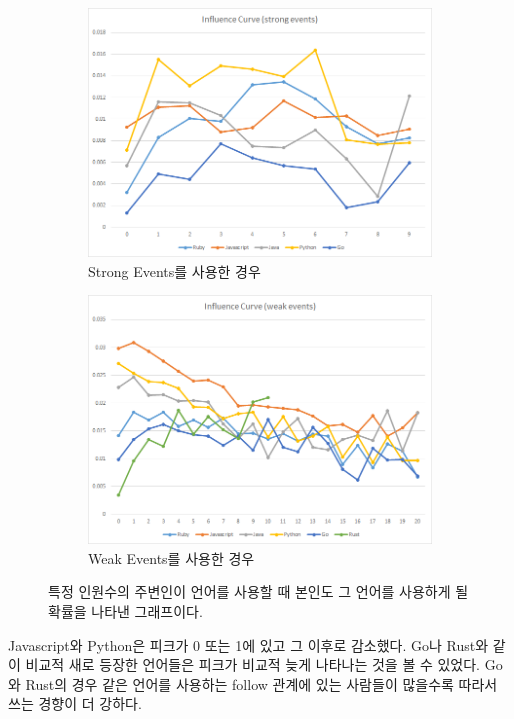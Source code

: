 \documentclass[10pt, a4paper, titlepage]{article}
\begin{document}
\begin{figure}
	\begin{subfigure}{0.99\textwidth}
		\includegraphics[width=\textwidth]{image01}
		\caption{Strong Events를 사용한 경우}
	\end{subfigure}

	\begin{subfigure}{0.99\textwidth}
		\includegraphics[width=\textwidth]{image18}
		\caption{Weak Events를 사용한 경우}
	\end{subfigure}

	\caption{특정 인원수의 주변인이 언어를 사용할 때 본인도 그 언어를 사용하게 될 확률을 나타낸 그래프이다.}
\label{fig:infcurve}
\end{figure}


Javascript와 Python은 피크가 0 또는 1에 있고 그 이후로 감소했다. Go나 Rust와 같이 비교적 새로 등장한 언어들은 피크가 비교적 늦게 나타나는 것을 볼 수 있었다. Go와 Rust의 경우 같은 언어를 사용하는 follow 관계에 있는 사람들이 많을수록 따라서 쓰는 경향이 더 강하다. 
\end{document}
